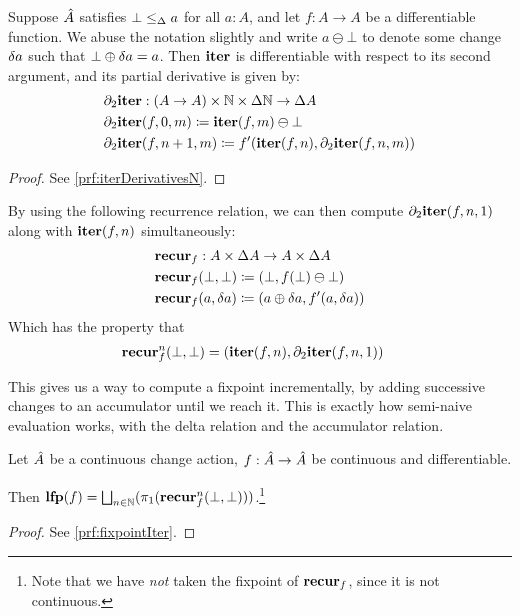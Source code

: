 \begin{prop}[name=Derivative of the iteration map with respect to $n$, restate=iterDerivativesN]
  \label{prop:iterDerivativesN}
  Suppose $\hat{A}$ satisfies $\bot \leq_\Delta a$ for all $a : A$, and let 
  $f: A \rightarrow A$ be a differentiable function. We abuse the notation slightly and write $a \ominus \bot$ to denote
  some change $\delta a$ such that $\bot \oplus \delta a = a$. Then $\mathbf{iter}$ is differentiable with respect to its second
  argument, and its partial derivative is given by:
  \begin{align*}
    &\partial_2{\mathbf{iter}}: (A \rightarrow A) \times \mathbb{N} \times \Delta \mathbb{N} \rightarrow \Delta A\\
    &\partial_2{\mathbf{iter}}(f, 0, m) \coloneqq \mathbf{iter}(f, m) \ominus \bot\\
    &\partial_2{\mathbf{iter}}(f, n+1, m) \coloneqq f'(\mathbf{iter}(f, n), \partial_2{\mathbf{iter}}(f, n, m))
  \end{align*}
\end{prop}
\ifproofs
\begin{proof}
  See \cref{prf:iterDerivativesN}.
\end{proof}
\fi

By using the following recurrence relation, 
we can then compute $\partial_2{\mathbf{iter}}(f, n, 1)$ along with $\mathbf{iter}(f, n)$ simultaneously:
\begin{align*}
  &\mathbf{recur}_f : A \times \Delta A \rightarrow A \times \Delta A\\
  &\mathbf{recur}_f (\bot, \bot) \coloneqq (\bot, f(\bot) \ominus \bot)\\
  &\mathbf{recur}_f (a, \delta a) \coloneqq (a \oplus \delta a, f'(a, \delta a))
\end{align*}
Which has the property that
\begin{align*}
  &\mathbf{recur}_f^n (\bot, \bot) = (\mathbf{iter}(f, n), \partial_2{\mathbf{iter}}(f, n, 1))
\end{align*}

This gives us a way to compute a fixpoint incrementally, by adding successive
changes to an accumulator until we reach it. This is exactly how
semi-naive evaluation works, with the delta relation and the accumulator relation.

\begin{thm}[name=Incremental computation of least fixpoints, restate=fixpointIter]
\label{thm:fixpointIter}
  Let $\hat{A}$ be a continuous change action, $f: \hat{A} \rightarrow
  \hat{A}$ be continuous and differentiable.

  Then $\mathbf{lfp}(f) = \bigsqcup_{n \in \mathbb{N}}(\pi_1(\mathbf{recur}_f^n(\bot, \bot)))$.\footnote{
    Note that we have \emph{not} taken the fixpoint of $\mathbf{recur}_f$, since it is
    not continuous.}
\end{thm}
\ifproofs
\begin{proof}
  See \cref{prf:fixpointIter}.
\end{proof}
\fi

